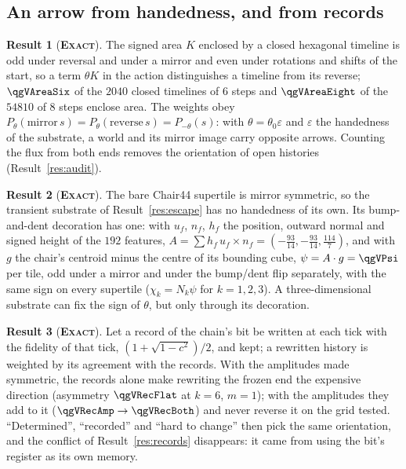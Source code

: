 \documentclass[11pt]{article}
\newcommand{\exact}{\textbf{\textsc{Exact}}}
\theoremstyle{definition}
\newtheorem{result}{Result}
\begin{document}
\subsection{An arrow from handedness, and from records}\label{sec:second-arrow}
\begin{result}[\exact]\label{res:areaterm}
The signed area $K$ enclosed by a closed hexagonal timeline is odd under reversal and under a mirror and even under rotations and shifts of the start, so a term $\theta K$ in the action distinguishes a timeline from its reverse; $\qgVAreaSix$ of the $2040$ closed timelines of $6$ steps and $\qgVAreaEight$ of the $54810$ of $8$ steps enclose area. The weights obey $P_\theta(\text{mirror}\,s)=P_\theta(\text{reverse}\,s)=P_{-\theta}(s)$: with $\theta=\theta_0\varepsilon$ and $\varepsilon$ the handedness of the substrate, a world and its mirror image carry opposite arrows. Counting the flux from both ends removes the orientation of open histories (Result~\ref{res:audit}).
\end{result}
\begin{result}[\exact]\label{res:psi}
The bare Chair44 supertile is mirror symmetric, so the transient substrate of Result~\ref{res:escape} has no handedness of its own. Its bump-and-dent decoration has one: with $u_f$, $n_f$, $h_f$ the position, outward normal and signed height of the $192$ features, $A=\sum h_f\,u_f\times n_f=(-\tfrac{93}{14},-\tfrac{93}{14},\tfrac{114}{7})$, and with $g$ the chair's centroid minus the centre of its bounding cube, $\psi=A\cdot g=\qgVPsi$ per tile, odd under a mirror and under the bump/dent flip separately, with the same sign on every supertile ($\chi_k=N_k\psi$ for $k=1,2,3$). A three-dimensional substrate can fix the sign of $\theta$, but only through its decoration.
\end{result}
\begin{result}[\exact]\label{res:recordstore}
Let a record of the chain's bit be written at each tick with the fidelity of that tick, $(1+\sqrt{1-c^2})/2$, and kept; a rewritten history is weighted by its agreement with the records. With the amplitudes made symmetric, the records alone make rewriting the frozen end the expensive direction (asymmetry $\qgVRecFlat$ at $k=6$, $m=1$); with the amplitudes they add to it ($\qgVRecAmp\to\qgVRecBoth$) and never reverse it on the grid tested. ``Determined'', ``recorded'' and ``hard to change'' then pick the same orientation, and the conflict of Result~\ref{res:records} disappears: it came from using the bit's register as its own memory.
\end{result}
\end{document}
